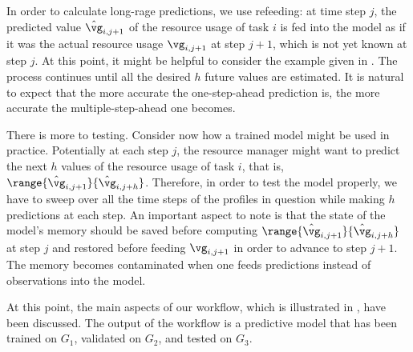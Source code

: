 In order to calculate long-rage predictions, we use refeeding: at time step $j$,
the predicted value $\hat{\vg}_{i,j + 1}$ of the resource usage of task $i$ is
fed into the model as if it was the actual resource usage $\vg_{i,j + 1}$ at
step $j + 1$, which is not yet known at step $j$. At this point, it might be
helpful to consider the example given in . The process
continues until all the desired $h$ future values are estimated. It is natural
to expect that the more accurate the one-step-ahead prediction is, the more
accurate the multiple-step-ahead one becomes.

There is more to testing. Consider now how a trained model might be used in
practice. Potentially at each step $j$, the resource manager might want to
predict the next $h$ values of the resource usage of task $i$, that is,
$\range{\hat{\vg}_{i,j + 1}}{\hat{\vg}_{i,j + h}}$. Therefore, in order to test
the model properly, we have to sweep over all the time steps of the profiles in
question while making $h$ predictions at each step. An important aspect to note
is that the state of the model's memory should be saved before computing
$\range{\hat{\vg}_{i,j + 1}}{\hat{\vg}_{i,j + h}}$ at step $j$ and restored
before feeding $\vg_{i,j + 1}$ in order to advance to step $j + 1$. The memory
becomes contaminated when one feeds predictions instead of observations into the
model.

At this point, the main aspects of our workflow, which is illustrated in
, have been discussed. The output of the workflow is a predictive
model that has been trained on $G_1$, validated on $G_2$, and tested on $G_3$.

